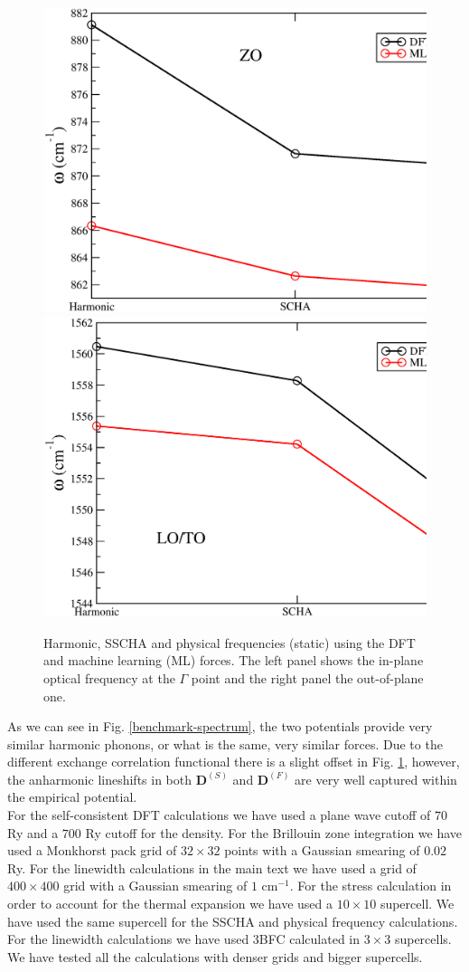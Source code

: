 \begin{figure}[ht]
\includegraphics[width=0.49\linewidth]{Figures/bm1.eps}
\includegraphics[width=0.49\linewidth]{Figures/bm2.eps}
\caption[Harmonic, SSCHA and physical frequencies (static) using the DFT and machine learning (ML) forces.]{Harmonic, 
	SSCHA and physical frequencies (static) using the DFT and machine learning (ML) forces. The left panel shows 
	the in-plane optical frequency at the $\Gamma$ point and the right panel the out-of-plane one.}
\label{benchmark}
\end{figure}
As we can see in Fig. \ref{benchmark-spectrum}, the two potentials provide very similar harmonic phonons, or what is 
the same, very similar forces. Due to the different exchange correlation functional there is a slight offset in 
Fig. \ref{benchmark}, however, the anharmonic lineshifts in both $\boldsymbol{D}^{(S)}$ and $\boldsymbol{D}^{(F)}$ 
are very well captured within the empirical potential. \\

For the self-consistent DFT calculations we have used a plane wave cutoff of $70$ Ry and a $700$ Ry cutoff for the 
density. For the Brillouin zone integration we have used a Monkhorst pack grid\cite{monkhorst1976special} of 
$32\times32$ points with a Gaussian smearing of $0.02$ Ry. For the linewidth calculations in the main text we have 
used a grid of $400\times400$ grid with a Gaussian smearing of $1$ cm$^{-1}$. For the stress calculation in order 
to account for the thermal expansion we have used a $10\times10$ supercell. We have used the same supercell for 
the SSCHA and physical frequency calculations. For the linewidth calculations we have used 3BFC calculated in 
$3\times3$ supercells. We have tested all the calculations with denser grids and bigger supercells.

